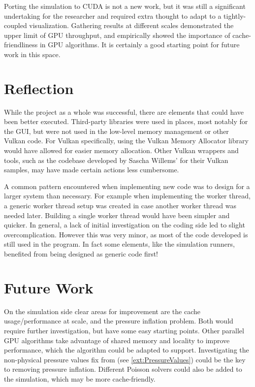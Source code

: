 Porting the simulation to CUDA is not a new work, but it was still a significant undertaking for the researcher and required extra thought to adapt to a tightly-coupled visualization.
Gathering results at different scales demonstrated the upper limit of GPU throughput, and empirically showed the importance of cache-friendliness in GPU algorithms.
It is certainly a good starting point for future work in this space.

\section{Reflection}
While the project as a whole was successful, there are elements that could have been better executed.
Third-party libraries were used in places, most notably for the GUI, but were not used in the low-level memory management or other Vulkan code.
For Vulkan specifically, using the Vulkan Memory Allocator library  would have allowed for easier memory allocation.
Other Vulkan wrappers and tools, such as the codebase developed by Sascha Willems' for their Vulkan samples, may have made certain actions less cumbersome.

A common pattern encountered when implementing new code was to design for a larger system than necessary.
For example when implementing the worker thread, a generic worker thread setup was created in case another worker thread was needed later.
Building a single worker thread would have been simpler and quicker.
In general, a lack of initial investigation on the coding side led to slight overcomplication.
However this was very minor, as most of the code developed is still used in the program.
In fact some elements, like the simulation runners, benefited from being designed as generic code first!

\section{Future Work}

On the simulation side clear areas for improvement are the cache usage/performance at scale, and the pressure inflation problem.
Both would require further investigation, but have some easy starting points.
Other parallel GPU algorithms take advantage of shared memory and locality to improve performance, which the algorithm could be adapted to support.
Investigating the non-physical pressure values fix from \cite{book:griebel1998numerical} (see \cref{ext:PressureValues}) could be the key to removing pressure inflation.
Different Poisson solvers could also be added to the simulation, which may be more cache-friendly.

